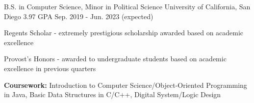 

\begin{cventries}

    \cventry
    {B.S. in Computer Science, Minor in Political Science} %
    {University of California, San Diego} %
    {3.97 GPA} %
    {Sep. 2019 - Jun. 2023 (expected)} %
    {
      \begin{cvitems} %
        \item {Regents Scholar - extremely prestigious scholarship awarded based on academic excellence}
        \item {Provost's Honors - awarded to undergraduate students based on academic excellence in previous quarters}
        \item {\textbf{Coursework:} Introduction to Computer Science/Object-Oriented Programming in Java, Basic Data Structures in C/C++, Digital System/Logic Design}
      \end{cvitems}
    }

\end{cventries}
